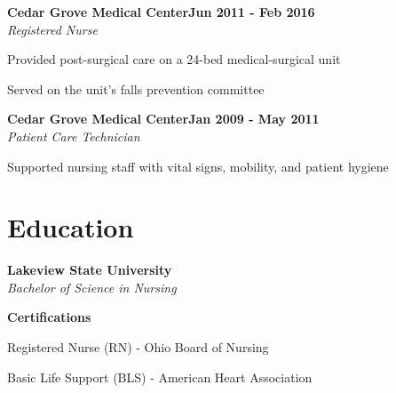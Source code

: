 \documentclass[letterpaper,10pt]{article}
\newcommand{\heading}[2]{
  \hspace{10pt}#1\hfill#2\\
}
\newcommand{\headingBf}[2]{
  \heading{\textbf{#1}}{\textbf{#2}}
}
\newcommand{\headingIt}[2]{
  \heading{\textit{#1}}{\textit{#2}}
}
\newenvironment{resume_list}{
  \vspace{-7pt}
  \begin{itemize}[itemsep=-2px, parsep=1pt, leftmargin=30pt]
}{
  \end{itemize}
}
\begin{document}
  \headingBf{Cedar Grove Medical Center}{Jun 2011 - Feb 2016}
  \headingIt{Registered Nurse}{}
  \begin{resume_list}
    \item Provided post-surgical care on a 24-bed medical-surgical unit
    \item Served on the unit's falls prevention committee
  \end{resume_list}

  \headingBf{Cedar Grove Medical Center}{Jan 2009 - May 2011}
  \headingIt{Patient Care Technician}{}
  \begin{resume_list}
    \item Supported nursing staff with vital signs, mobility, and patient hygiene
  \end{resume_list}


  \section{Education}

  \headingBf{Lakeview State University}{}
  \headingIt{Bachelor of Science in Nursing}{}

  \vspace{5pt}
  \headingBf{Certifications}{}
  \begin{resume_list}
    \item Registered Nurse (RN) - Ohio Board of Nursing
    \item Basic Life Support (BLS) - American Heart Association
  \end{resume_list}
\end{document}
